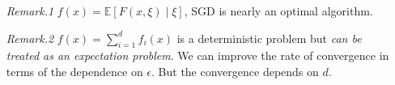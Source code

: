 \documentclass[a4paper, 11pt]{article}
\begin{document}
\begin{itemize}
  \item[\textit{Remark.1}] $f(x) = \mathbb{E}\left[F(x, \xi)\middle|\xi\right]$, SGD is nearly an optimal algorithm.
  \item[\textit{Remark.2}] $f(x) = \sum_{i=1}^d f_i(x)$ is a deterministic problem but \emph{can be treated as an expectation problem}.  We can improve the rate of convergence in terms of the dependence on $\epsilon$. But the convergence depends on $d$.
\end{itemize}
\end{document}
